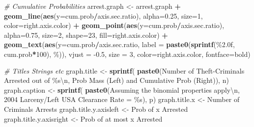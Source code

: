 \documentclass[
]{book}
\newenvironment{Shaded}{\begin{snugshade}}{\end{snugshade}}
\newcommand{\CharTok}[1]{\textcolor[rgb]{0.31,0.60,0.02}{#1}}
\newcommand{\CommentTok}[1]{\textcolor[rgb]{0.56,0.35,0.01}{\textit{#1}}}
\newcommand{\DataTypeTok}[1]{\textcolor[rgb]{0.13,0.29,0.53}{#1}}
\newcommand{\DecValTok}[1]{\textcolor[rgb]{0.00,0.00,0.81}{#1}}
\newcommand{\FloatTok}[1]{\textcolor[rgb]{0.00,0.00,0.81}{#1}}
\newcommand{\KeywordTok}[1]{\textcolor[rgb]{0.13,0.29,0.53}{\textbf{#1}}}
\newcommand{\NormalTok}[1]{#1}
\newcommand{\OperatorTok}[1]{\textcolor[rgb]{0.81,0.36,0.00}{\textbf{#1}}}
\newcommand{\StringTok}[1]{\textcolor[rgb]{0.31,0.60,0.02}{#1}}
\begin{document}
\begin{Shaded}
\begin{Highlighting}[]
\CommentTok{\# Cumulative Probabilities}
\NormalTok{arrest.graph \textless{}{-}}\StringTok{ }\NormalTok{arrest.graph }\OperatorTok{+}
\StringTok{    }\KeywordTok{geom\_line}\NormalTok{(}\KeywordTok{aes}\NormalTok{(}\DataTypeTok{y=}\NormalTok{cum.prob}\OperatorTok{/}\NormalTok{axis.sec.ratio),}
              \DataTypeTok{alpha=}\FloatTok{0.25}\NormalTok{, }\DataTypeTok{size=}\DecValTok{1}\NormalTok{, }\DataTypeTok{color=}\NormalTok{right.axis.color) }\OperatorTok{+}
\StringTok{    }\KeywordTok{geom\_point}\NormalTok{(}\KeywordTok{aes}\NormalTok{(}\DataTypeTok{y=}\NormalTok{cum.prob}\OperatorTok{/}\NormalTok{axis.sec.ratio),}
               \DataTypeTok{alpha=}\FloatTok{0.75}\NormalTok{, }\DataTypeTok{size=}\DecValTok{2}\NormalTok{, }\DataTypeTok{shape=}\DecValTok{23}\NormalTok{, }\DataTypeTok{fill=}\NormalTok{right.axis.color) }\OperatorTok{+}
\StringTok{    }\KeywordTok{geom\_text}\NormalTok{(}\KeywordTok{aes}\NormalTok{(}\DataTypeTok{y=}\NormalTok{cum.prob}\OperatorTok{/}\NormalTok{axis.sec.ratio,}
                  \DataTypeTok{label =} \KeywordTok{paste0}\NormalTok{(}\KeywordTok{sprintf}\NormalTok{(}\StringTok{\textquotesingle{}\%2.0f\textquotesingle{}}\NormalTok{, cum.prob}\OperatorTok{*}\DecValTok{100}\NormalTok{), }\StringTok{\textquotesingle{}\%\textquotesingle{}}\NormalTok{)),}
              \DataTypeTok{vjust =} \FloatTok{{-}0.5}\NormalTok{, }\DataTypeTok{size =} \DecValTok{3}\NormalTok{, }\DataTypeTok{color=}\NormalTok{right.axis.color, }\DataTypeTok{fontface=}\StringTok{\textquotesingle{}bold\textquotesingle{}}\NormalTok{)}

\CommentTok{\# Titles Strings etc}
\NormalTok{graph.title \textless{}{-}}\StringTok{ }\KeywordTok{sprintf}\NormalTok{(}
    \KeywordTok{paste0}\NormalTok{(}\StringTok{\textquotesingle{}Number of Theft{-}Criminals Arrested out of \%s}\CharTok{\textbackslash{}n}\StringTok{\textquotesingle{}}\NormalTok{,}
           \StringTok{\textquotesingle{}Prob Mass (Left) and Cumulative Prob (Right)\textquotesingle{}}\NormalTok{), n)}
\NormalTok{graph.caption \textless{}{-}}\StringTok{ }\KeywordTok{sprintf}\NormalTok{(}
    \KeywordTok{paste0}\NormalTok{(}\StringTok{\textquotesingle{}Assuming the binomial properties apply}\CharTok{\textbackslash{}n}\StringTok{\textquotesingle{}}\NormalTok{,}
           \StringTok{\textquotesingle{}2004 Larceny/Left USA Clearance Rate = \%s\textquotesingle{}}\NormalTok{), p)}
\NormalTok{graph.title.x \textless{}{-}}\StringTok{ \textquotesingle{}Number of Criminals Arrests\textquotesingle{}}
\NormalTok{graph.title.y.axisleft \textless{}{-}}\StringTok{ \textquotesingle{}Prob of x Arrested\textquotesingle{}}
\NormalTok{graph.title.y.axisright \textless{}{-}}\StringTok{ \textquotesingle{}Prob of at most x Arrested\textquotesingle{}}


\end{Highlighting}
\end{Shaded}
\end{document}
